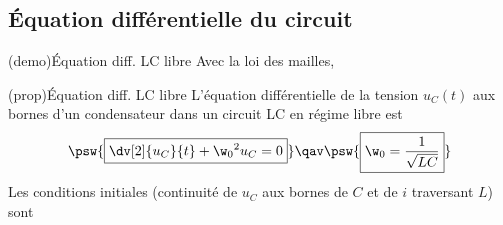 \documentclass[../../main/main.tex]{subfiles}
\begin{document}
\subsection{Équation différentielle du circuit}
\begin{tcb*}[label=demo:eqdiffrc](demo){Équation diff. LC libre}
	Avec la loi des mailles,
\end{tcb*}
\begin{tcb*}[label=prop:eqdiffrc, sidebyside, righthand ratio=.4](prop){Équation diff. LC libre}
	L'équation différentielle de la tension $u_C(t)$ aux bornes d'un
	condensateur dans un circuit LC en régime libre est
	\[
		\psw{%
			\boxed{\dv[2]{u_C}{t} + \w_0{}^2u_C = 0}
		}%
		\qav
		\psw{%
			\boxed{\w_0 = \frac{1}{\sqrt{LC}}}
		}%
	\]
	\tcblower
	Les conditions initiales (continuité de $u_C$ aux bornes de $C$
	et de $i$ traversant $L$) sont
\end{tcb*}
\end{document}
